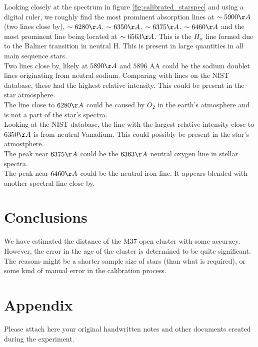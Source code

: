 \documentclass[12pt,a4paper]{article}
\begin{document}
      Looking closely at the spectrum in figure \ref{fig:calibrated_starspec} and using a digital ruler, we roughly find the most prominent absorption lines at $\sim 5900 \AA$(two lines close by), $\sim 6280 \AA$, $\sim 6350 \AA$, $\sim 6375 \AA$, $\sim 6460 \AA$ and the most prominent line 
      being located at $\sim 6563 \AA$. This is the $H_\alpha$ line formed due to the Balmer transition in neutral H. This is present in large quantities in all main sequence stars.\\
      Two lines close by, likely at $5890 \AA$ and $5896$ AA could be the sodium doublet lines originating from neutral sodium. Comparing with lines on the NIST database, these had the highest relative intensity.\cite{NIST_ASD} This could be present in the star atmosphere. \\
      The line close to $6280 \AA$ could be caused by $O_2$ in the earth's atmosphere and is not a part of the star's spectra. \\

      Looking at the NIST database, the line with the largest relative intensity close to $6350 \AA$ is from neutral Vanadium. This could possibly be present in the star's atmostphere.\\ 

      The peak near $6375 \AA$ could be the $6363 \AA$ neutral oxygen line in stellar spectra.\\

      The peak near $6460 \AA$ could be the neutral iron line. It appears blended with another spectral line close by. 



\section{Conclusions}
We have estimated the distance of the M37 open cluster with some accuracy. However, the error in the age of the cluster is determined to be quite significant. The reasons might be a shorter sample size of stars (than what is required), or some kind of manual error in the calibration process.

\setcounter{secnumdepth}{0}

\printbibliography
\appendix
\section{Appendix}

Please attach here your original handwritten notes and other documents created during the experiment.
\end{document}
